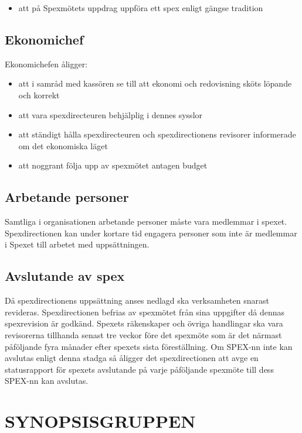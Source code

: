 \documentclass[a4paper]{article}
\begin{document}
\begin{itemize}
  \item att på Spexmötets uppdrag uppföra ett spex enligt gängse tradition
\end{itemize}

\subsection{Ekonomichef}
Ekonomichefen åligger:

\begin{itemize}
  \item att i samråd med kassören se till att ekonomi och redovisning sköts löpande och korrekt
  \item att vara spexdirecteuren behjälplig i dennes sysslor
  \item att ständigt hålla spexdirecteuren och spexdirectionens revisorer informerade om det ekonomiska läget
  \item att noggrant följa upp av spexmötet antagen budget
\end{itemize}

\subsection{Arbetande personer}
Samtliga i organisationen arbetande personer måste vara medlemmar i spexet. Spexdirectionen kan under kortare tid engagera personer som inte är medlemmar i Spexet till arbetet med uppsättningen.

\subsection{Avslutande av spex}
Då spexdirectionens uppsättning anses nedlagd ska verksamheten snarast revideras. Spexdirectionen befrias av spexmötet från sina uppgifter då dennas spexrevision är godkänd.\newline
\newline
Spexets räkenskaper och övriga handlingar ska vara revisorerna tillhanda senast tre veckor före det spexmöte som är det närmast påföljande fyra månader efter spexets sista föreställning.\newline
\newline
Om SPEX-nn inte kan avslutas enligt denna stadga så åligger det spexdirectionen att avge en statusrapport för spexets avslutande på varje påföljande spexmöte till dess SPEX-nn kan avslutas.

\section{SYNOPSISGRUPPEN}
\label{section:synopsisgruppen}
\end{document}
